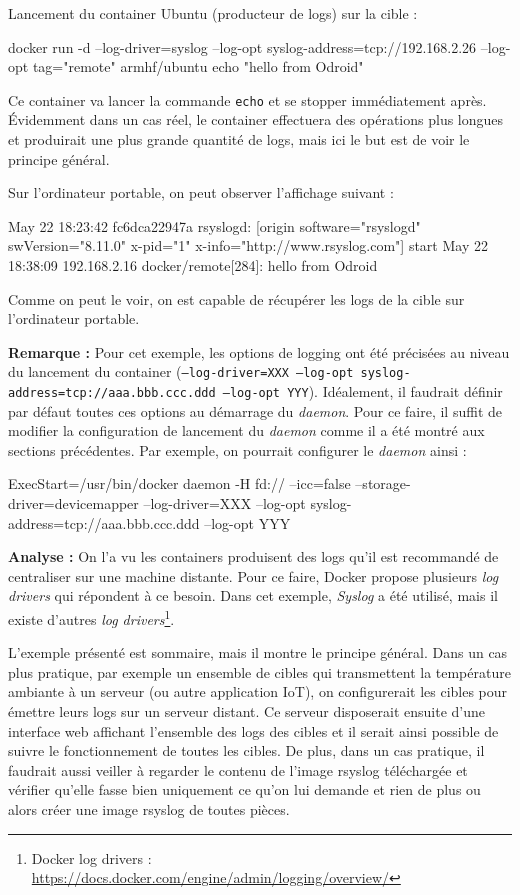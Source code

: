 \documentclass[11pt,a4paper,oneside]{report}
\newcommand{\code}[1]{\texttt{#1}}
\begin{document}
Lancement du container Ubuntu (producteur de logs) sur la cible :
\begin{bashcode}
docker run -d --log-driver=syslog --log-opt syslog-address=tcp://192.168.2.26 --log-opt tag="remote" armhf/ubuntu echo "hello from Odroid"
\end{bashcode}

Ce container va lancer la commande \code{echo} et se stopper immédiatement après. Évidemment dans un cas réel, le container effectuera des opérations plus longues et produirait une plus grande quantité de logs, mais ici le but est de voir le principe général.

Sur l'ordinateur portable, on peut observer l'affichage suivant :
\begin{bashcode}
May 22 18:23:42 fc6dca22947a rsyslogd: [origin software="rsyslogd" swVersion="8.11.0" x-pid="1" x-info="http://www.rsyslog.com"] start
May 22 18:38:09 192.168.2.16 docker/remote[284]: hello from Odroid
\end{bashcode}

Comme on peut le voir, on est capable de récupérer les logs de la cible sur l'ordinateur portable.

\textbf{Remarque : } Pour cet exemple, les options de logging ont été précisées au niveau du lancement du container (\code{--log-driver=XXX --log-opt syslog-address=tcp://aaa.bbb.ccc.ddd --log-opt YYY}). Idéalement, il faudrait définir par défaut toutes ces options au démarrage du \textit{daemon}. Pour ce faire, il suffit de modifier la configuration de lancement du \textit{daemon} comme il a été montré aux sections précédentes. Par exemple, on pourrait configurer le \textit{daemon} ainsi :

\begin{bashcode}
ExecStart=/usr/bin/docker daemon -H fd:// --icc=false --storage-driver=devicemapper --log-driver=XXX --log-opt syslog-address=tcp://aaa.bbb.ccc.ddd --log-opt YYY
\end{bashcode}

\textbf{Analyse : } On l'a vu les containers produisent des logs qu'il est recommandé de centraliser sur une machine distante. Pour ce faire, Docker propose plusieurs \textit{log drivers} qui répondent à ce besoin. Dans cet exemple, \textit{Syslog} a été utilisé, mais il existe d'autres \textit{log drivers}\footnote{Docker log drivers : \url{https://docs.docker.com/engine/admin/logging/overview/}}.

L'exemple présenté est sommaire, mais il montre le principe général. Dans un cas plus pratique, par exemple un ensemble de cibles qui transmettent la température ambiante à un serveur (ou autre application IoT), on configurerait les cibles pour émettre leurs logs sur un serveur distant. Ce serveur disposerait ensuite d'une interface web affichant l'ensemble des logs des cibles et il serait ainsi possible de suivre le fonctionnement de toutes les cibles. De plus, dans un cas pratique, il faudrait aussi veiller à regarder le contenu de l'image rsyslog téléchargée et vérifier qu'elle fasse bien uniquement ce qu'on lui demande et rien de plus ou alors créer une image rsyslog de toutes pièces.
\end{document}
